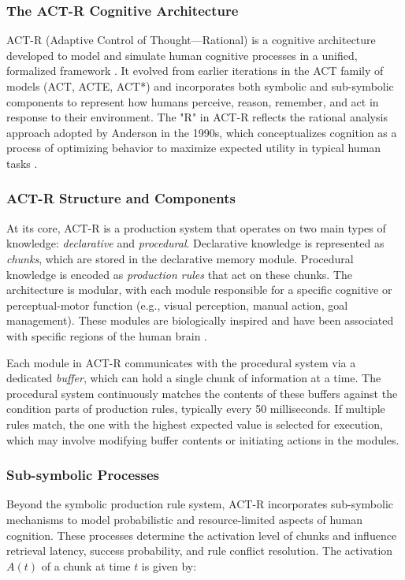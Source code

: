 \documentclass[12pt,a4paper]{article} %
\begin{document}
	\subsubsection{The ACT-R Cognitive Architecture}
	ACT-R (Adaptive Control of Thought—Rational) is a cognitive architecture developed to model and simulate human cognitive processes in a unified, formalized framework \parencite{anderson_integrated_2004}. It evolved from earlier iterations in the ACT family of models (ACT, ACTE, ACT*) and incorporates both symbolic and sub-symbolic components to represent how humans perceive, reason, remember, and act in response to their environment. The "R" in ACT-R reflects the rational analysis approach adopted by Anderson in the 1990s, which conceptualizes cognition as a process of optimizing behavior to maximize expected utility in typical human tasks \parencite{whitehill_understanding_2013}.

	\subsubsection*{ACT-R Structure and Components}
	At its core, ACT-R is a production system that operates on two main types of knowledge: \textit{declarative} and \textit{procedural}. Declarative knowledge is represented as \textit{chunks}, which are stored in the declarative memory module. Procedural knowledge is encoded as \textit{production rules} that act on these chunks. The architecture is modular, with each module responsible for a specific cognitive or perceptual-motor function (e.g., visual perception, manual action, goal management). These modules are biologically inspired and have been associated with specific regions of the human brain \parencite{anderson_how_2007}.

	Each module in ACT-R communicates with the procedural system via a dedicated \textit{buffer}, which can hold a single chunk of information at a time. The procedural system continuously matches the contents of these buffers against the condition parts of production rules, typically every 50 milliseconds. If multiple rules match, the one with the highest expected value is selected for execution, which may involve modifying buffer contents or initiating actions in the modules.

	\subsubsection*{Sub-symbolic Processes}
	Beyond the symbolic production rule system, ACT-R incorporates sub-symbolic mechanisms to model probabilistic and resource-limited aspects of human cognition. These processes determine the activation level of chunks and influence retrieval latency, success probability, and rule conflict resolution. The activation $A(t)$ of a chunk at time $t$ is given by:
\end{document}
